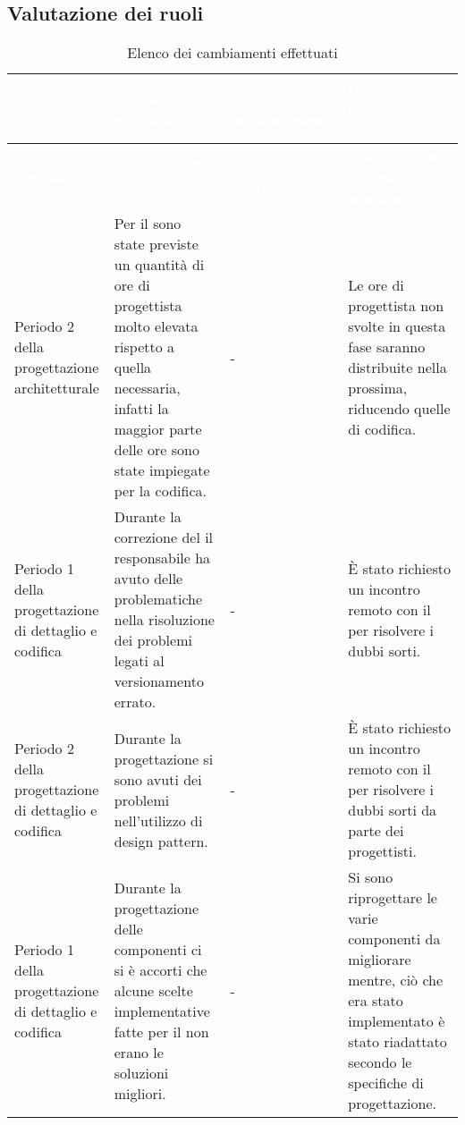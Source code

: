 \subsection{Valutazione dei ruoli}

{
	\renewcommand{\arraystretch}{1.5}
	\centering
	\begin{longtable}{ C{3cm} C{4cm} C{3cm} C{4cm}}
		\caption{Elenco dei cambiamenti effettuati}\\
		\textcolor{white}{\textbf{Periodo}} & \textcolor{white}{\textbf{Problema/Da migliorare}} & \textcolor{white}{\textbf{Obiettivo di miglioramento}} & \textcolor{white}{\textbf{Cambiamento nel way of working}}\\
		\endfirsthead
		\textcolor{white}{\textbf{Periodo}} & \textcolor{white}{\textbf{Problema/Da migliorare}} &
		\textcolor{white}{\textbf{Obiettivo di miglioramento}} & \textcolor{white}{\textbf{Cambiamento nel way of working}}\\
		\endhead
		
		Periodo 2 della progettazione architetturale & Per il  sono state previste un quantità di ore di progettista molto elevata rispetto a quella necessaria, infatti la maggior parte delle ore sono state impiegate per la codifica. & - & Le ore di progettista non svolte in questa fase saranno distribuite nella prossima, riducendo quelle di codifica.\\
		
		Periodo 1 della progettazione di dettaglio e codifica & Durante la correzione del \PdP{} il responsabile ha avuto delle problematiche nella risoluzione dei problemi legati al versionamento errato. & - & È stato richiesto un incontro remoto con il \VT{} per risolvere i dubbi sorti.\\
		
		Periodo 2 della progettazione di dettaglio e codifica & Durante la progettazione si sono avuti dei problemi nell'utilizzo di design pattern. & - & È stato richiesto un incontro remoto con il \CR{} per risolvere i dubbi sorti da parte dei progettisti.\\
		
		Periodo 1 della progettazione di dettaglio e codifica & Durante la progettazione delle componenti ci si è accorti che alcune scelte implementative fatte per il  non erano le soluzioni migliori. & - & Si sono riprogettare le varie componenti da migliorare mentre, ciò che era stato implementato è stato riadattato secondo le specifiche di progettazione. \\
		

\end{longtable}}
